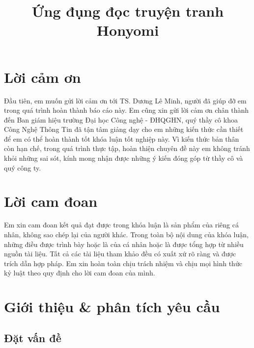 \documentclass{report}
\title{Ứng đụng đọc truyện tranh Honyomi}
\begin{document}

\clearpage

\tableofcontents
\clearpage

\listoffigures



% 
\chapter*{Lời cảm ơn}

Đầu tiên, em muốn gửi lời cảm ơn tới TS. Dương Lê Minh, người đã giúp đỡ em trong quá trình hoàn thành báo cáo này.
Em cũng xin gửi lời cảm ơn chân thành đến Ban giám hiệu trường Đại học Công nghệ - ĐHQGHN, quý thầy cô khoa Công Nghệ Thông Tin đã tận tâm giảng dạy cho em những kiến thức cần thiết để em có thể hoàn thành tốt khóa luận tốt nghiệp này.
Vì kiến thức bản thân còn hạn chế, trong quá trình thực tập, hoàn thiện chuyên đề này em không tránh khỏi những sai sót, kính mong nhận được những ý kiến đóng góp từ thầy cô và quý công ty.

\chapter*{Lời cam đoan}

Em xin cam đoan kết quả đạt được trong khóa luận là sản phẩm của riêng cá nhân, không sao chép lại của người khác. Trong toàn bộ nội dung của khóa luận, những điều được trình bày hoặc là của cá nhân hoặc là được tổng hợp từ nhiều nguồn tài liệu. Tất cả các tài liệu tham khảo đều có xuất xứ rõ ràng và được trích dẫn hợp pháp. Em xin hoàn toàn chịu trách nhiệm và chịu mọi hình thức kỷ luật theo quy định cho lời cam đoan của mình.

\chapter{Giới thiệu \& phân tích yêu cầu}
\section{Đặt vấn đề}

\end{document}
